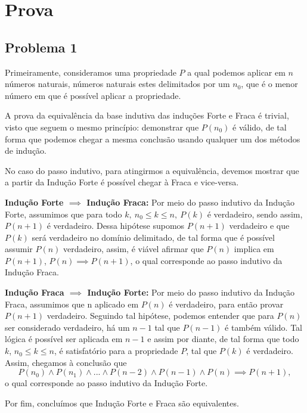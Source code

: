 \documentclass[a4paper, 10pt]{article}
\begin{document}
\section{Prova}

\subsection{Problema 1}

Primeiramente, consideramos uma propriedade $P$ a qual podemos aplicar em $n$ números naturais, números naturais estes delimitados por um $n_0$, que é o menor número em que é possível aplicar a propriedade.

A prova da equivalência da base indutiva das induções Forte e Fraca é trivial, visto que seguem o mesmo princípio: demonstrar que $P(n_0)$ é válido, de tal forma que podemos chegar a mesma conclusão usando qualquer um dos métodos de indução.

No caso do passo indutivo, para atingirmos a equivalência, devemos mostrar que a partir da Indução Forte é possível chegar à Fraca e vice-versa.

\textbf{Indução Forte $\implies$ Indução Fraca:}
	Por meio do passo indutivo da Indução Forte, assumimos que para todo $k,\:n_0 \leq k \leq n,\:P(k)$ é verdadeiro, sendo assim, $P(n+1)$ é verdadeiro.
	Dessa hipótese supomos $P(n+1)$ verdadeiro e que $P(k)$ será verdadeiro no domínio delimitado, de tal forma que é possível assumir $P(n)$ verdadeiro, assim, é viável afirmar que $P(n)$ implica em $P(n+1)$, $P(n) \implies P(n+1)$, o qual corresponde ao passo indutivo da Indução Fraca.
	
\textbf{Indução Fraca $\implies$ Indução Forte:}
	Por meio do passo indutivo da Indução Fraca, assumimos que n aplicado em $P(n)$ é verdadeiro, para então provar $P(n+1)$ verdadeiro.
	Seguindo tal hipótese, podemos entender que para $P(n)$ ser considerado verdadeiro, há um $n-1$ tal que $P(n-1)$ é também válido. Tal lógica é possível ser aplicada em $n-1$ e assim por diante, de tal forma que todo $k$, $n_0 \leq k \leq n$, é satisfatório para a propriedade $P$, tal que $P(k)$ é verdadeiro.
	Assim, chegamos à conclusão que 
\begin{equation*}
  P(n_0) \wedge P(n_1) \wedge ... \wedge P(n-2) \wedge P(n-1) \wedge P(n) \implies P(n+1),
\end{equation*}    
    o qual corresponde ao passo indutivo da Indução Forte.

Por fim, concluímos que Indução Forte e Fraca são equivalentes.
\end{document}
